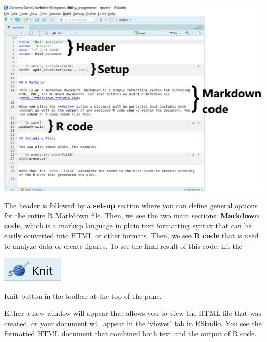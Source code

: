 \documentclass[
  oneside]{book}
\begin{document}
\begin{center}\includegraphics[width=1\linewidth]{images/fd284f329222582a56ecb4906f99afee} \end{center}

The header is followed by a \textbf{set-up} section where you can define general
options for the entire R Markdown file. Then, we see the two main sections:
\textbf{Markdown code}, which is a markup language in plain text formatting syntax
that can be easily converted into HTML or other formats. Then, we see \textbf{R code}
that is used to analyze data or create figures. To see the final result of this
code, hit the

\begin{center}\includegraphics[width=0.2\linewidth]{images/270645a5be86fa1d9d534f78b8ca0724} \end{center}

Knit button in the toolbar at the top of the pane.

Either a new window will appear that allows you to view the HTML file that was
created, or your document will appear in the `viewer' tab in RStudio. You see
the formatted HTML document that combined both text and the output of R code.
\end{document}
